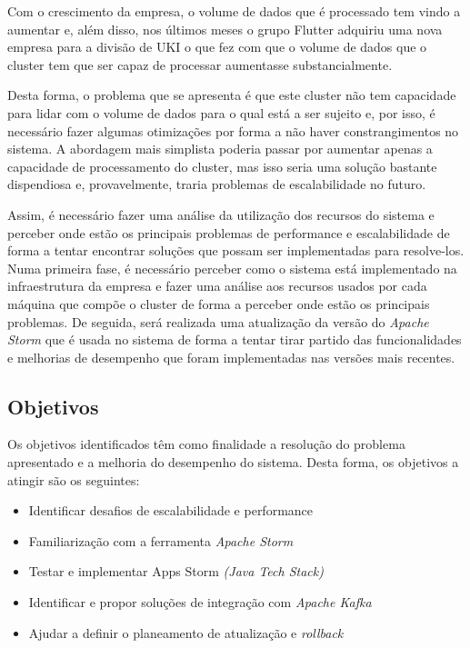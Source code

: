 Com o crescimento da empresa, o volume de dados que é processado tem vindo a aumentar e, além disso,
nos últimos meses o grupo Flutter adquiriu uma nova empresa para a divisão de \ac{UKI} o que fez 
com que o volume de dados que o \gls{cluster} tem que ser capaz de processar aumentasse 
substancialmente.

Desta forma, o problema que se apresenta é que este \gls{cluster} não tem capacidade para lidar
com o volume de dados para o qual está a ser sujeito e, por isso, é necessário fazer algumas
otimizações por forma a não haver constrangimentos no sistema. A abordagem mais simplista poderia 
passar por aumentar apenas a capacidade de processamento do \gls{cluster}, mas isso seria uma 
solução bastante dispendiosa e, provavelmente, traria problemas de escalabilidade no futuro.

Assim, é necessário fazer uma análise da utilização dos recursos do sistema e perceber onde estão 
os principais problemas de performance e escalabilidade de forma a tentar encontrar soluções que 
possam ser implementadas para resolve-los. Numa primeira fase, é necessário perceber como o sistema 
está implementado na infraestrutura da empresa e fazer uma análise aos recursos usados por cada 
máquina que compõe o \gls{cluster} de forma a perceber onde estão os principais problemas. De 
seguida, será realizada uma atualização da versão do \textit{Apache Storm} que é usada no sistema 
de forma a tentar tirar partido das funcionalidades e melhorias de desempenho que foram 
implementadas nas versões mais recentes.

\subsection{Objetivos}

Os objetivos identificados têm como finalidade a resolução do problema apresentado e a melhoria do
desempenho do sistema. Desta forma, os objetivos a atingir são os seguintes:

\begin{itemize}
  \item Identificar desafios de escalabilidade e performance
  \item Familiarização com a ferramenta \textit{Apache Storm }
  \item Testar e implementar Apps Storm \textit{(Java Tech Stack)}
  \item Identificar e propor soluções de integração com \textit{Apache Kafka}
  \item Ajudar a definir o planeamento de atualização e \textit{rollback}
\end{itemize}

